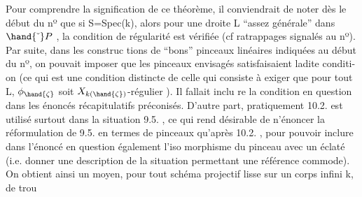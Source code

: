  

Pour comprendre la signification de ce théorème, il conviendrait
de noter dès le début du nº \hand{(}que  si S=Spec(k)\hand{)}, alors pour une droite
L ``assez générale'' dans $\hand{\check{\ }}P$ ,  la condition de régularité est vérifiée 
(cf ratrappages signalés au  nº).  Par suite, dans les construc%
tions de ``bons'' pinceaux linéaires  indiquées au début du nº, on pouvait
imposer que les pinceaux envisagés  satisfaisaient ladite conditi-
on  (ce qui  est une condition distincte de celle qui consiste à
exiger que pour tout \hand{$\zeta\in$}L,  $\phi_{\hand{\zeta}}$  soit $X_{k(\hand{\zeta})}$-régulier ). Il fallait inclu
re la condition en question dans les énoncés récapitulatifs préconisés.
  D'autre part, pratiquement  10.2. est
utilisé surtout dans la situation 9.5. ,  ce qui  rend  désirable de
n'énoncer la réformulation de  9.5.  en termes de pinceaux qu'après
10.2. , pour pouvoir  inclure dans l'énoncé en question  également l'iso
morphisme du pinceau avec un éclaté (i.e. donner une description de la
situation  permettant une référence commode).  On obtient ainsi un
moyen, pour tout schéma projectif lisse sur un corps infini k,  de trou
